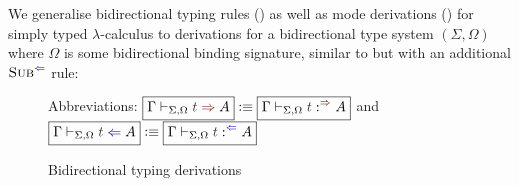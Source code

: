 We generalise bidirectional typing rules () as well as mode derivations () for simply typed $\lambda$-calculus to derivations for a bidirectional type system $(\Sigma, \Omega)$ where $\Omega$ is some bidirectional binding signature, similar to  but with an additional $\ChkRule{Sub}$ rule:
\begin{definition}\label{def:bidirectional-typing-derivations}\label{def:mode-derivations}
  \begin{figure}
    \centering
    \small
    Abbreviations: $\boxed{\Gamma \vdash_{\Sigma, \Omega} \isTerm{t} \syn A} \defeq \boxed{\Gamma \vdash_{\Sigma, \Omega} \isTerm{t} :^{\syn} A}$ and $\boxed{\Gamma \vdash_{\Sigma, \Omega} \isTerm{t} \chk A} \defeq \boxed{\Gamma \vdash_{\Sigma, \Omega} \isTerm{t} :^{\chk} A}$
    \caption{Bidirectional typing derivations}
    \label{fig:bidirectional-typing-derivations}
  \end{figure}
  \begin{figure}
    \centering

\end{figure}
\end{definition}
